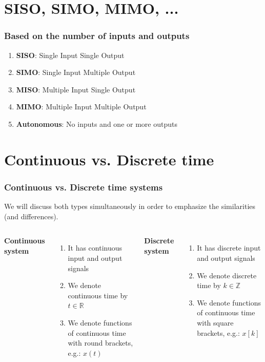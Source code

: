 \section{SISO, SIMO, MIMO, ...} 

\begin{frame}
	\frametitle{Based on the number of inputs and outputs}
	\vspace{-8ex}
	\begin{enumerate}
		\item \textbf{SISO}: Single Input Single Output
		\medskip
		\item \textbf{SIMO}: Single Input Multiple Output
		\medskip
		\item \textbf{MISO}: Multiple Input Single Output
		\medskip
		\item \textbf{MIMO}: Multiple Input Multiple Output
		\medskip
		\item \textbf{Autonomous}: No inputs and one or more outputs
	\end{enumerate}
\end{frame}

\section{Continuous vs. Discrete time} 

\begin{frame}
	\frametitle{Continuous vs. Discrete time systems}
	\vspace{-2ex}
	We will discuss both types simultaneously in order to emphasize the similarities (and differences).\\
	\medskip
	\begin{columns}[c] 
		
		\center \textbf{Continuous system}
		\begin{enumerate}
			\item It has continuous input and output signals
			\item We denote continuous time by $t \in \mathds{R}$
			\item We denote functions of continuous time with round brackets, e.g.: $x(t)$
		\end{enumerate}
		
		\center \textbf{Discrete system}
		\begin{enumerate}
			\item It has discrete input and output signals
			\item We denote discrete time by $k \in \mathds{Z}$
			\item We denote functions of continuous time with square brackets, e.g.: $x[k]$
		\end{enumerate}
		
	\end{columns}
\end{frame}

